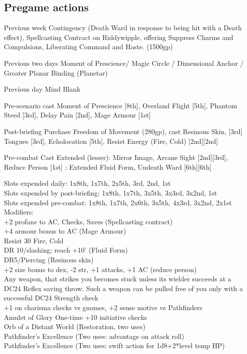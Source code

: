 {\subsection{Pregame actions}
\begin{compactenum}
 \item [Previous week] Contingency (Death Ward in response to being hit with a Death effect), Spellcasting Contract on Riddywipple,
     offering Suppress Charms and Compulsions, Liberating Command and Haste. (1500gp)
 \item [Previous two days]  Moment of Prescience/ Magic Circle / Dimensional Anchor / Greater Planar Binding (Planetar) 
 \item [Previous day] Mind Blank
 \item [Pre-scenario] cast Moment of Prescience [8th], Overland Flight [5th], Phantom Steed [3rd], Delay Pain [2nd], Mage Armour [1st]
 \item [Post-briefing] Purchase Freedom of Movement (280gp), cast Resinous Skin, [3rd] Tongues [3rd], Echolocation [5th], Resist Energy (Fire, Cold) [2nd][2nd]
 \item [Pre-combat] Cast Extended (lesser): Mirror Image, Arcane Sight [2nd][3rd], Reduce Person [1st] ; Extended Fluid Form, Undeath Ward [6th][6th]
\end{compactenum}

Slots expended daily: 1x8th, 1x7th, 2x5th, 3rd, 2nd, 1st \\
Slots expended by post-briefing: 1x8th, 1x7th, 3x5th, 3x3rd, 3x2nd, 1st\\
Slots expended pre-combat: 1x8th, 1x7th, 2x6th, 3x5th, 4x3rd, 3x2nd, 2x1st\\

Modifiers: \\
+2 profane to AC, Checks, Saves (Spellcasting contract)\\
+4 armour bonus to AC (Mage Armour) \\
Resist 30 Fire, Cold \\
DR 10/slashing; reach +10' (Fluid Form) \\
DR5/Piercing (Resinous skin) \\
+2 size bonus to dex, -2 str, +1 attacks, +1 AC (reduce person) \\


Any weapon, that strikes you becomes stuck unless its wielder succeeds at a DC24 Reflex saving throw. Such a weapon can be pulled free of you 
only with a successful DC24 Strength check\\

+1 on charisma checks vs gnomes, +2 sense motive vs Pathfinders \\
Amulet of Glory One-time +10 initiative checks\\
Orb of a Distant World (Restoration, two uses) \\
Pathfinder's Excellence (Two uses: advantage on attack roll)\\
Pathfinder's Excellence (Two uses: swift action for 1d8+2*level temp HP)\\
}

\newcommand{\people}{
}

\newcommand{\scenariolist}{

}


\newcommand{\biography}{

}

